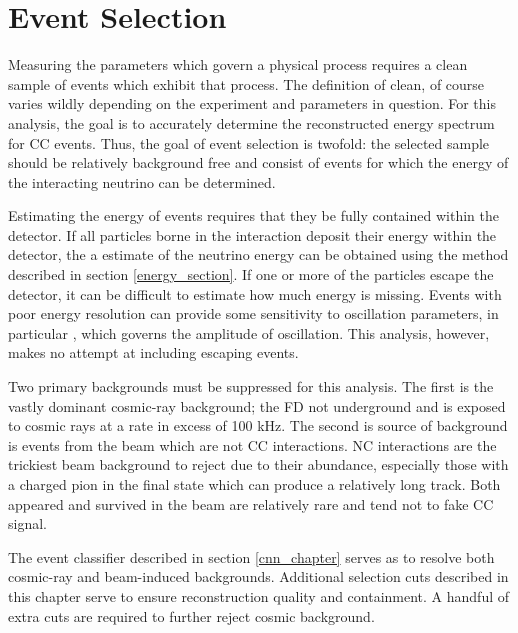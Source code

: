 \chapter{Event Selection}
\label{event_selection_chapter}

Measuring the parameters which govern a physical process requires
a clean sample of events which exhibit that process.
The definition of clean, of course varies wildly depending on the
experiment and parameters in question.
For this analysis, the goal is to accurately determine the reconstructed energy
spectrum for \numu CC events.
Thus, the goal of event selection is twofold: the selected sample should be
relatively background free and consist of events for which the energy of the
interacting neutrino can be determined.

Estimating the energy of events requires that they be fully contained
within the detector.
If all particles borne in the interaction deposit their energy within
the detector, the a estimate of the neutrino energy can be obtained using
the method described in section \ref{energy_section}.
If one or more of the particles escape the detector, it can be difficult
to estimate how much energy is missing.
Events with poor energy resolution can provide some sensitivity to oscillation
parameters, in particular \thetatth, which governs the amplitude of oscillation.
This analysis, however, makes no attempt at including escaping events.

Two primary backgrounds must be suppressed for this analysis.
The first is the vastly dominant cosmic-ray background; the FD not underground
and is exposed to cosmic rays at a rate in excess of 100 kHz.
The second is source of background is events from the \numi beam which are
not \numu CC interactions.
NC interactions are the trickiest beam background to reject due to their
abundance, especially those with a charged pion in the final state which
can produce a relatively long track.
Both appeared and survived \nue in the beam are relatively rare and tend
not to fake \numu CC signal.

The event classifier described in section \ref{cnn_chapter} serves as to resolve
both cosmic-ray and beam-induced backgrounds.
Additional selection cuts described in this chapter serve to ensure
reconstruction quality and containment.
A handful of extra cuts are required to further reject cosmic background.


